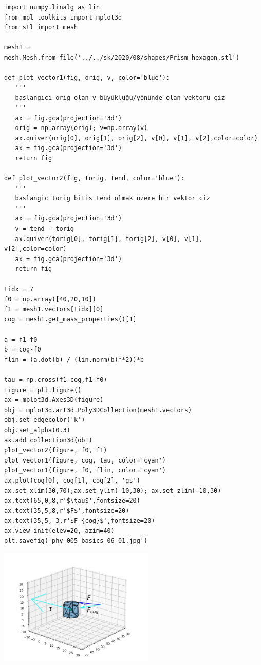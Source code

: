 \documentclass[12pt,fleqn]{article}\usepackage{../../common}
\begin{document}
\begin{verbatim}
import numpy.linalg as lin
from mpl_toolkits import mplot3d
from stl import mesh

mesh1 = mesh.Mesh.from_file('../../sk/2020/08/shapes/Prism_hexagon.stl')

def plot_vector1(fig, orig, v, color='blue'):
   '''
   baslangıcı orig olan v büyüklüğü/yönünde olan vektorü çiz
   '''
   ax = fig.gca(projection='3d')
   orig = np.array(orig); v=np.array(v)
   ax.quiver(orig[0], orig[1], orig[2], v[0], v[1], v[2],color=color)
   ax = fig.gca(projection='3d')  
   return fig

def plot_vector2(fig, torig, tend, color='blue'):
   '''
   baslangic torig bitis tend olmak uzere bir vektor ciz
   '''
   ax = fig.gca(projection='3d')
   v = tend - torig
   ax.quiver(torig[0], torig[1], torig[2], v[0], v[1], v[2],color=color)
   ax = fig.gca(projection='3d')  
   return fig

tidx = 7
f0 = np.array([40,20,10])
f1 = mesh1.vectors[tidx][0]
cog = mesh1.get_mass_properties()[1]

a = f1-f0
b = cog-f0
flin = (a.dot(b) / (lin.norm(b)**2))*b

tau = np.cross(f1-cog,f1-f0)
figure = plt.figure()
ax = mplot3d.Axes3D(figure)
obj = mplot3d.art3d.Poly3DCollection(mesh1.vectors)
obj.set_edgecolor('k')
obj.set_alpha(0.3)
ax.add_collection3d(obj)
plot_vector2(figure, f0, f1)
plot_vector1(figure, cog, tau, color='cyan')
plot_vector1(figure, f0, flin, color='cyan')
ax.plot(cog[0], cog[1], cog[2], 'gs')
ax.set_xlim(30,70);ax.set_ylim(-10,30); ax.set_zlim(-10,30)
ax.text(65,0,8,r'$\tau$',fontsize=20)
ax.text(35,5,8,r'$F$',fontsize=20)
ax.text(35,5,-3,r'$F_{cog}$',fontsize=20)
ax.view_init(elev=20, azim=40)
plt.savefig('phy_005_basics_06_01.jpg')
\end{verbatim}

\includegraphics[width=20em]{phy_005_basics_06_01.jpg}
\end{document}
